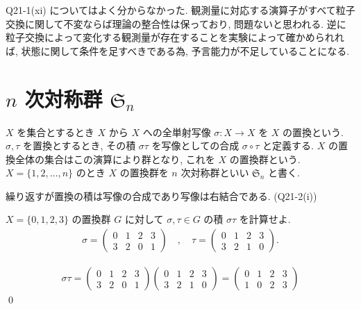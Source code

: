 \documentclass[uplatex,dvipdfmx,a4paper,11pt]{jlreq}
\makeatletter
\renewcommand{\SS}{\mathfrak{S}}
\numberwithin{equation}{section}
\theoremstyle{definition}
\renewenvironment{proof}[1][\proofname]{\par
  \normalfont
  \topsep6\p@\@plus6\p@ \trivlist
  \item[\hskip\labelsep{\bfseries #1}\@addpunct{\bfseries}]\ignorespaces\quad\par
}{%
  \qed\endtrivlist\@endpefalse
}
\renewcommand\proofname{証明}
\makeatother
\begin{document}
Q21-1(xi) についてはよく分からなかった. 観測量に対応する演算子がすべて粒子交換に関して不変ならば理論の整合性は保っており, 問題ないと思われる. 逆に粒子交換によって変化する観測量が存在することを実験によって確かめられれば, 状態に関して条件を足すべきである為, 予言能力が不足していることになる.

\section{$n$ 次対称群 $\SS_n$}
\begin{definition}[$n$ 次対称群]
  $X$ を集合とするとき $X$ から $X$ への全単射写像 $\sigma: X\to X$ を $X$ の置換という.
  $\sigma,\tau$ を置換とするとき, その積 $\sigma\tau$ を写像としての合成 $\sigma\circ\tau$ と定義する. $X$ の置換全体の集合はこの演算により群となり, これを $X$ の置換群という.
  $X = \{1,2,\ldots,n\}$ のとき $X$ の置換群を $n$ 次対称群といい $\SS_n$ と書く.
\end{definition}
繰り返すが置換の積は写像の合成であり写像は右結合である. (Q21-2(i))
\begin{problem}[Q21-2(ii)]
$X = \{0, 1, 2, 3\}$ の置換群 $G$ に対して $\sigma,\tau\in G$ の積 $\sigma\tau$ を計算せよ.
\begin{align}
  \sigma = \begin{pmatrix}
             0 & 1 & 2 & 3 \\
             3 & 2 & 0 & 1
           \end{pmatrix} \quad , \quad
  \tau = \begin{pmatrix}
           0 & 1 & 2 & 3 \\
           3 & 2 & 1 & 0
         \end{pmatrix}.
\end{align}
\end{problem}
\begin{proof}
  \begin{align}
    \sigma\tau =
    \begin{pmatrix}
      0 & 1 & 2 & 3 \\
      3 & 2 & 0 & 1
    \end{pmatrix}
    \begin{pmatrix}
      0 & 1 & 2 & 3 \\
      3 & 2 & 1 & 0
    \end{pmatrix}
    =
    \begin{pmatrix}
      0 & 1 & 2 & 3 \\
      1 & 0 & 2 & 3
    \end{pmatrix}
  \end{align}
\end{proof}
\end{document}
